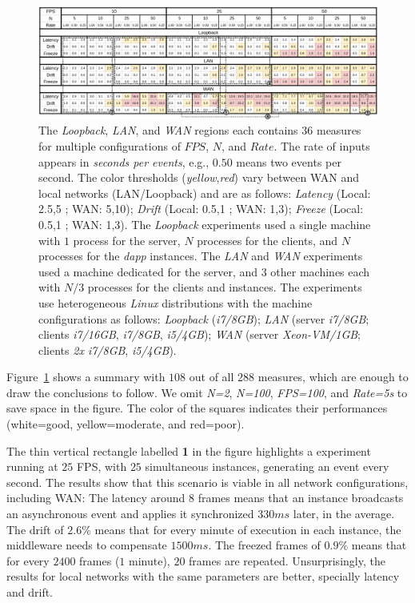 \documentclass[sigplan,screen]{acmart}
\newcommand{\dapp}{\emph{dapp}\xspace}
\begin{document}
\begin{figure}[t]
  \centering
  \includegraphics[width=\linewidth]{table2}
  \caption{
    \label{fig.table}
The \emph{Loopback}, \emph{LAN}, and \emph{WAN} regions each contains $36$
measures for multiple configurations of $FPS$, $N$, and $Rate$.
The rate of inputs appears in \emph{seconds per events}, e.g., $0.50$ means two
events per second.
%
The color thresholds (\emph{yellow},\emph{red}) vary between WAN and local
networks (LAN/Loopback) and are as follows:
    \emph{Latency} (Local: 2.5,5 ; WAN: 5,10);
    \emph{Drift}   (Local: 0.5,1 ; WAN: 1,3);
    \emph{Freeze}  (Local: 0.5,1 ; WAN: 1,3).
%
The \emph{Loopback} experiments used a single machine with $1$ process for the
server, $N$ processes for the clients, and $N$ processes for the \dapp
instances.
The \emph{LAN} and \emph{WAN} experiments used a machine dedicated for the
server, and $3$ other machines each with $N/3$ processes for the clients and
instances.
%
The experiments use heterogeneous \emph{Linux} distributions with the machine
configurations as follows:
    \emph{Loopback} (\emph{i7/8GB});
    \emph{LAN} (server \emph{i7/8GB}; clients \emph{i7/16GB}, \emph{i7/8GB}, \emph{i5/4GB});
    \emph{WAN} (server \emph{Xeon-VM/1GB}; clients \emph{2x i7/8GB}, \emph{i5/4GB}).
  }
\end{figure}

Figure~\ref{fig.table} shows a summary with $108$ out of all $288$ measures,
which are enough to draw the conclusions to follow.
We omit \emph{N=2}, \emph{N=100}, \emph{FPS=100}, and \emph{Rate=5s} to save
space in the figure.
The color of the squares indicates their performances
    (white=good, yellow=moderate, and red=poor).

The thin vertical rectangle labelled \textbf{1} in the figure highlights a
experiment running at $25$ FPS, with $25$ simultaneous instances, generating an
event every second.
%
The results show that this scenario is viable in all network configurations,
including WAN:
%
The latency around $8$ frames means that an instance broadcasts an asynchronous
event and applies it synchronized $330ms$ later, in the average.
The drift of $2.6\%$ means that for every minute of execution in each instance,
the middleware needs to compensate $1500ms$.
The freezed frames of $0.9\%$ means that for every $2400$ frames ($1$ minute),
$20$ frames are repeated.
%
Unsurprisingly, the results for local networks with the same parameters are
better, specially latency and drift.
\end{document}
